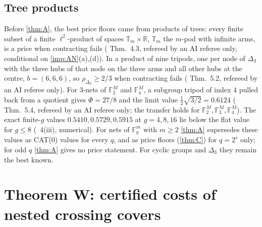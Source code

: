 \documentclass[10pt]{amsart}
\theoremstyle{plain}
\theoremstyle{definition}
\theoremstyle{remark}
\numberwithin{equation}{section}
\newcommand{\F}{\mathbb{F}}
\newcommand{\R}{\mathbb{R}}
\newcommand{\stR}{refereed by an AI referee only}
\newcommand{\stN}{numerical}
\newcommand{\cond}[1]{conditional on #1}
\begin{document}
\subsection{Tree products}\label{sec:trees}
Before \cref{thm:A}, the best price floors came from products of trees: every finite subset of a finite
$\ell^2$-product of spaces $\mathbb T_m\times\R$, $\mathbb T_m$ the $m$-pod with infinite arms, is a price when
contracting fails ( Thm.~4.3, \stR, \cond{\cref{imp:AN}(a),(d)}). In a product of nine
tripods, one per node of $\Delta_3$ with the three hubs of that node on the three arms and all other hubs
at the centre, $b=(6,6,6)$, so $\rho_{\Delta_3}\ge2/3$ when contracting fails (
Thm.~5.2, \stR). For 3-nets of $\F_2^M$ and $\F_4^M$, a subgroup tripod of index $4$ pulled back from a
quotient gives $\Phi=27/8$ and the limit value $\tfrac12\sqrt{3/2}=0.6124$ ( Thm.~5.4,
\stR; the transfer holds for $\F_2^M,\F_3^M,\F_4^M$). The exact finite-$g$ values $0.5410,0.5729,0.5915$
at $g=4,8,16$ lie below the flat value for $g\le8$ (~4(iii), \stN). For nets of $\F_q^m$
with $m\ge2$ \cref{thm:A} supersedes these values as CAT(0) values for every $q$, and as price floors
(\cref{thm:C}) for $q=2^s$ only; for odd $q$ \cref{thm:A} gives no price statement. For cyclic groups
and $\Delta_3$ they remain the best known.

\section{Theorem W: certified costs of nested crossing covers}\label{sec:thmW}
\end{document}
